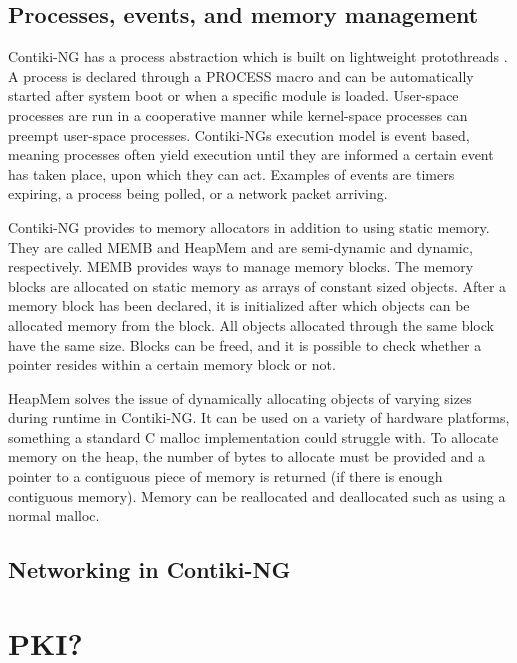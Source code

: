 \documentclass[0-thesis.tex]{subfiles}
\begin{document}
\subsection{Processes, events, and memory management}
\label{ssec:process-event-memory}
Contiki-NG has a process abstraction which is built on lightweight protothreads
\parencite{protothreads}. A process is declared through a PROCESS macro and can be
automatically started after system boot or when a specific module is loaded. User-space
processes are run in a cooperative manner while kernel-space processes can preempt
user-space processes. Contiki-NGs execution model is event based, meaning processes often
yield execution until they are informed a certain event has taken place, upon which they
can act. Examples of events are timers expiring, a process being polled, or a network
packet arriving. 

Contiki-NG provides to memory allocators in addition to using static memory. They are
called MEMB and HeapMem and are semi-dynamic and dynamic, respectively. MEMB provides ways
to manage memory blocks. The memory blocks are allocated on static memory as arrays of
constant sized objects. After a memory block has been declared, it is initialized after
which objects can be allocated memory from the block. All objects allocated through the
same block have the same size. Blocks can be freed, and it is possible to check whether a
pointer resides within a certain memory block or not.

HeapMem solves the issue of dynamically allocating objects of varying sizes during runtime
in Contiki-NG. It can be used on a variety of hardware platforms, something a standard C
malloc implementation could struggle with. To allocate memory on the heap, the number of
bytes to allocate must be provided and a pointer to a contiguous piece of memory is
returned (if there is enough contiguous memory). Memory can be reallocated and deallocated
such as using a normal malloc.

\subsection{Networking in Contiki-NG}
\label{ssec:networking-contiki}


\section{PKI?}
\label{ssec:pki}
\end{document}
